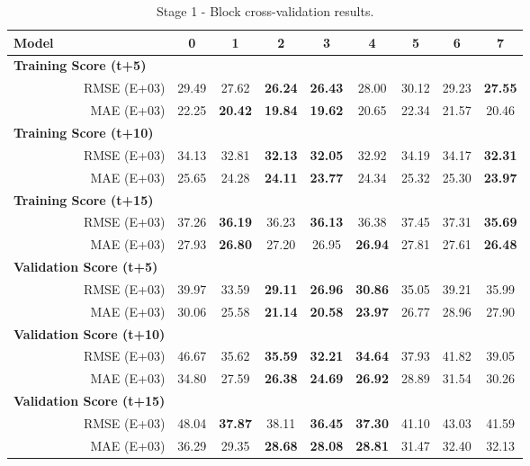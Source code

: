 \begin{table}[htbp]
  \centering
  \caption{Stage 1 - Block cross-validation results.}
    \begin{tabular}{cr|cccccccc}
    \toprule
    \multicolumn{1}{l}{\textbf{Model}} &       & 0     & 1     & 2     & \textbf{3} & 4     & 5     & 6     & 7 \\
    \midrule
    \multicolumn{2}{l|}{\textbf{Training Score (t+5)}} &       &       &       &       &       &       &       &  \\
          & RMSE (E+03) & 29.49 & 27.62 & \textbf{26.24} & \textbf{26.43} & 28.00 & 30.12 & 29.23 & \textbf{27.55} \\
          & MAE (E+03) & 22.25 & \textbf{20.42} & \textbf{19.84} & \textbf{19.62} & 20.65 & 22.34 & 21.57 & 20.46 \\
    \multicolumn{2}{l|}{\textbf{Training Score (t+10)}} &       &       &       &       &       &       &       &  \\
          & RMSE (E+03) & 34.13 & 32.81 & \textbf{32.13} & \textbf{32.05} & 32.92 & 34.19 & 34.17 & \textbf{32.31} \\
          & MAE (E+03) & 25.65 & 24.28 & \textbf{24.11} & \textbf{23.77} & 24.34 & 25.32 & 25.30 & \textbf{23.97} \\
    \multicolumn{2}{l|}{\textbf{Training Score (t+15)}} &       &       &       &       &       &       &       &  \\
          & RMSE (E+03) & 37.26 & \textbf{36.19} & 36.23 & \textbf{36.13} & 36.38 & 37.45 & 37.31 & \textbf{35.69} \\
          & MAE (E+03) & 27.93 & \textbf{26.80} & 27.20 & 26.95 & \textbf{26.94} & 27.81 & 27.61 & \textbf{26.48} \\
    \midrule
    \multicolumn{2}{l|}{\textbf{Validation Score (t+5)}} &       &       &       &       &       &       &       &  \\
          & RMSE (E+03) & 39.97 & 33.59 & \textbf{29.11} & \textbf{26.96} & \textbf{30.86} & 35.05 & 39.21 & 35.99 \\
          & MAE (E+03) & 30.06 & 25.58 & \textbf{21.14} & \textbf{20.58} & \textbf{23.97} & 26.77 & 28.96 & 27.90 \\
    \multicolumn{2}{l|}{\textbf{Validation Score (t+10)}} &       &       &       &       &       &       &       &  \\
          & RMSE (E+03) & 46.67 & 35.62 & \textbf{35.59} & \textbf{32.21} & \textbf{34.64} & 37.93 & 41.82 & 39.05 \\
          & MAE (E+03) & 34.80 & 27.59 & \textbf{26.38} & \textbf{24.69} & \textbf{26.92} & 28.89 & 31.54 & 30.26 \\
    \multicolumn{2}{l|}{\textbf{Validation Score (t+15)}} &       &       &       &       &       &       &       &  \\
          & RMSE (E+03) & 48.04 & \textbf{37.87} & 38.11 & \textbf{36.45} & \textbf{37.30} & 41.10 & 43.03 & 41.59 \\
          & MAE (E+03) & 36.29 & 29.35 & \textbf{28.68} & \textbf{28.08} & \textbf{28.81} & 31.47 & 32.40 & 32.13 \\
    \end{tabular}%
  \label{level21}%
\end{table}%
